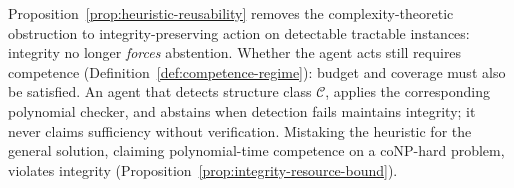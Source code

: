 \begin{remark}
Proposition~\ref{prop:heuristic-reusability} removes the complexity-theoretic obstruction to integrity-preserving action on detectable tractable instances: integrity no longer \emph{forces} abstention. Whether the agent acts still requires competence (Definition~\ref{def:competence-regime}): budget and coverage must also be satisfied. An agent that detects structure class $\mathcal{C}$, applies the corresponding polynomial checker, and abstains when detection fails maintains integrity; it never claims sufficiency without verification. Mistaking the heuristic for the general solution, claiming polynomial-time competence on a coNP-hard problem, violates integrity (Proposition~\ref{prop:integrity-resource-bound}).
\end{remark}
